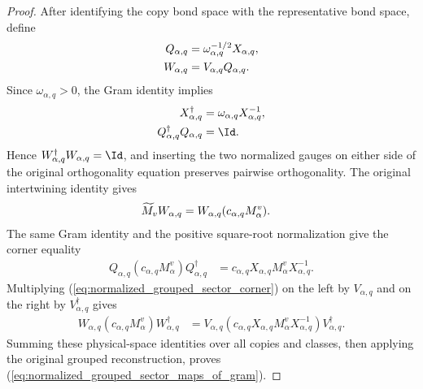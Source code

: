 \begin{proof}\leanok
    After identifying the copy bond space with the representative bond space,
    define
    \begin{align}
        Q_{\alpha,q}
         & =\omega_{\alpha,q}^{-1/2}X_{\alpha,q},
        \notag                                    \\
        W_{\alpha,q}
         & =V_{\alpha,q}Q_{\alpha,q}.
        \notag
    \end{align}
    Since $\omega_{\alpha,q}>0$, the Gram identity implies
    \begin{align}
        X_{\alpha,q}^\dagger
         & =\omega_{\alpha,q}X_{\alpha,q}^{-1},
        \notag                                  \\
        Q_{\alpha,q}^\dagger Q_{\alpha,q}
         & =\Id.
        \notag
    \end{align}
    Hence $W_{\alpha,q}^\dagger W_{\alpha,q}=\Id$, and inserting the two
    normalized gauges on either side of the original orthogonality equation
    preserves pairwise orthogonality. The original intertwining identity gives
    \begin{align}
        \widetilde M_vW_{\alpha,q}
         & =W_{\alpha,q}(c_{\alpha,q}M_\alpha^v).
        \notag
    \end{align}
    The same Gram identity and the positive square-root normalization give
    the corner equality
    \begin{align}
        Q_{\alpha,q}(c_{\alpha,q}M_\alpha^v)Q_{\alpha,q}^\dagger
         & =c_{\alpha,q}X_{\alpha,q}M_\alpha^vX_{\alpha,q}^{-1}.
        \label{eq:normalized_grouped_sector_corner}
    \end{align}
    Multiplying (\ref{eq:normalized_grouped_sector_corner}) on the left by
    $V_{\alpha,q}$ and on the right by $V_{\alpha,q}^\dagger$ gives
    \begin{align}
        W_{\alpha,q}(c_{\alpha,q}M_\alpha^v)W_{\alpha,q}^\dagger
         & =V_{\alpha,q}
        (c_{\alpha,q}X_{\alpha,q}M_\alpha^vX_{\alpha,q}^{-1})
        V_{\alpha,q}^\dagger.
    \end{align}
    Summing these physical-space identities over all copies and classes, then
    applying the original grouped reconstruction, proves
    (\ref{eq:normalized_grouped_sector_maps_of_gram}).
\end{proof}

